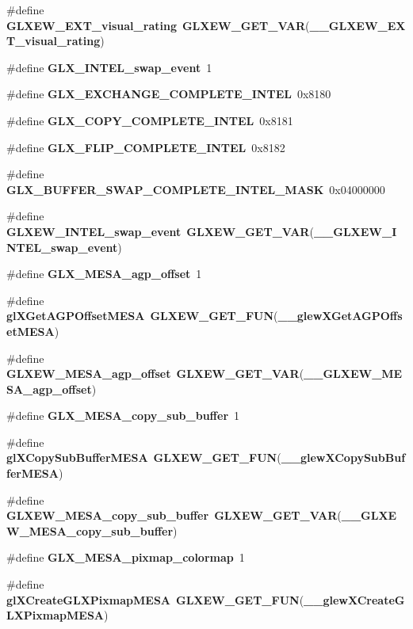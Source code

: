 \begin{DoxyCompactItemize}
\item 
\#define {\bf G\+L\+X\+E\+W\+\_\+\+E\+X\+T\+\_\+visual\+\_\+rating}~{\bf G\+L\+X\+E\+W\+\_\+\+G\+E\+T\+\_\+\+V\+AR}({\bf \+\_\+\+\_\+\+G\+L\+X\+E\+W\+\_\+\+E\+X\+T\+\_\+visual\+\_\+rating})
\item 
\#define {\bf G\+L\+X\+\_\+\+I\+N\+T\+E\+L\+\_\+swap\+\_\+event}~1
\item 
\#define {\bf G\+L\+X\+\_\+\+E\+X\+C\+H\+A\+N\+G\+E\+\_\+\+C\+O\+M\+P\+L\+E\+T\+E\+\_\+\+I\+N\+T\+EL}~0x8180
\item 
\#define {\bf G\+L\+X\+\_\+\+C\+O\+P\+Y\+\_\+\+C\+O\+M\+P\+L\+E\+T\+E\+\_\+\+I\+N\+T\+EL}~0x8181
\item 
\#define {\bf G\+L\+X\+\_\+\+F\+L\+I\+P\+\_\+\+C\+O\+M\+P\+L\+E\+T\+E\+\_\+\+I\+N\+T\+EL}~0x8182
\item 
\#define {\bf G\+L\+X\+\_\+\+B\+U\+F\+F\+E\+R\+\_\+\+S\+W\+A\+P\+\_\+\+C\+O\+M\+P\+L\+E\+T\+E\+\_\+\+I\+N\+T\+E\+L\+\_\+\+M\+A\+SK}~0x04000000
\item 
\#define {\bf G\+L\+X\+E\+W\+\_\+\+I\+N\+T\+E\+L\+\_\+swap\+\_\+event}~{\bf G\+L\+X\+E\+W\+\_\+\+G\+E\+T\+\_\+\+V\+AR}({\bf \+\_\+\+\_\+\+G\+L\+X\+E\+W\+\_\+\+I\+N\+T\+E\+L\+\_\+swap\+\_\+event})
\item 
\#define {\bf G\+L\+X\+\_\+\+M\+E\+S\+A\+\_\+agp\+\_\+offset}~1
\item 
\#define {\bf gl\+X\+Get\+A\+G\+P\+Offset\+M\+E\+SA}~{\bf G\+L\+X\+E\+W\+\_\+\+G\+E\+T\+\_\+\+F\+UN}({\bf \+\_\+\+\_\+glew\+X\+Get\+A\+G\+P\+Offset\+M\+E\+SA})
\item 
\#define {\bf G\+L\+X\+E\+W\+\_\+\+M\+E\+S\+A\+\_\+agp\+\_\+offset}~{\bf G\+L\+X\+E\+W\+\_\+\+G\+E\+T\+\_\+\+V\+AR}({\bf \+\_\+\+\_\+\+G\+L\+X\+E\+W\+\_\+\+M\+E\+S\+A\+\_\+agp\+\_\+offset})
\item 
\#define {\bf G\+L\+X\+\_\+\+M\+E\+S\+A\+\_\+copy\+\_\+sub\+\_\+buffer}~1
\item 
\#define {\bf gl\+X\+Copy\+Sub\+Buffer\+M\+E\+SA}~{\bf G\+L\+X\+E\+W\+\_\+\+G\+E\+T\+\_\+\+F\+UN}({\bf \+\_\+\+\_\+glew\+X\+Copy\+Sub\+Buffer\+M\+E\+SA})
\item 
\#define {\bf G\+L\+X\+E\+W\+\_\+\+M\+E\+S\+A\+\_\+copy\+\_\+sub\+\_\+buffer}~{\bf G\+L\+X\+E\+W\+\_\+\+G\+E\+T\+\_\+\+V\+AR}({\bf \+\_\+\+\_\+\+G\+L\+X\+E\+W\+\_\+\+M\+E\+S\+A\+\_\+copy\+\_\+sub\+\_\+buffer})
\item 
\#define {\bf G\+L\+X\+\_\+\+M\+E\+S\+A\+\_\+pixmap\+\_\+colormap}~1
\item 
\#define {\bf gl\+X\+Create\+G\+L\+X\+Pixmap\+M\+E\+SA}~{\bf G\+L\+X\+E\+W\+\_\+\+G\+E\+T\+\_\+\+F\+UN}({\bf \+\_\+\+\_\+glew\+X\+Create\+G\+L\+X\+Pixmap\+M\+E\+SA})

\end{DoxyCompactItemize}
